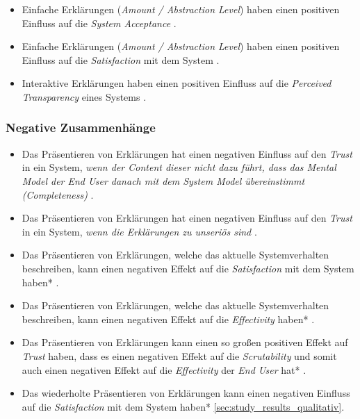 \begin{itemize}
    \item Einfache Erklärungen (\textit{Amount / Abstraction Level}) haben einen positiven Einfluss auf die \textit{System Acceptance} \cite{hleg2019policy, sovrano_modelling_2020}.
    \item Einfache Erklärungen (\textit{Amount / Abstraction Level}) haben einen positiven Einfluss auf die \textit{Satisfaction} mit dem System \cite{hleg2019policy, sovrano_modelling_2020}.
    \item Interaktive Erklärungen haben einen positiven Einfluss auf die \textit{Perceived Transparency} eines Systems \cite{cheng2019explaining}.
\end{itemize}



\subsubsection*{Negative Zusammenhänge}

\begin{itemize}
    \item Das Präsentieren von Erklärungen hat einen negativen Einfluss auf den \textit{Trust} in ein System, \textit{wenn der Content dieser nicht dazu führt, dass das Mental Model der End User danach mit dem System Model übereinstimmt (Completeness)} \cite{schrills_color_2020, chazette_end-users_nodate}.
    \item Das Präsentieren von Erklärungen hat einen negativen Einfluss auf den \textit{Trust} in ein System, \textit{wenn die Erklärungen zu unseriös sind} \cite{wang_is_2018}.
    \item Das Präsentieren von Erklärungen, welche das aktuelle Systemverhalten beschreiben, kann einen negativen Effekt auf die \textit{Satisfaction} mit dem System haben* \cite{koo_why_2015}.
    \item Das Präsentieren von Erklärungen, welche das aktuelle Systemverhalten beschreiben, kann einen negativen Effekt auf die \textit{Effectivity} haben* \cite{koo_why_2015}.
    \item Das Präsentieren von Erklärungen kann einen so großen positiven Effekt auf \textit{Trust} haben, dass es einen negativen Effekt auf die \textit{Scrutability} und somit auch einen negativen Effekt auf die \textit{Effectivity} der \textit{End User} hat* \cite{kohl_explainability_2019, gunning2019darpa}.
    \item Das wiederholte Präsentieren von Erklärungen kann einen negativen Einfluss auf die \textit{Satisfaction} mit dem System haben* \autoref{sec:study_results_qualitativ}.
\end{itemize}

